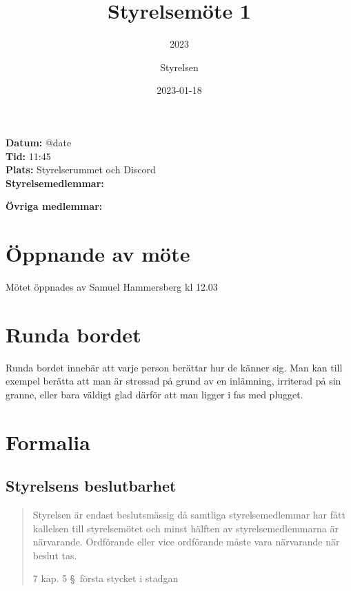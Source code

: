 \documentclass[protokoll]{dvd}
\begin{document}
\title{Styrelsemöte 1}
\subtitle{2023}
\author{Styrelsen}
\date{2023-01-18}

\textbf{Datum:} \csname @date\endcsname\\
\textbf{Tid:} 11:45\\
\textbf{Plats:} Styrelserummet och Discord\\
\textbf{Styrelsemedlemmar:}
\begin{närvarande_förtroendevalda}
\end{närvarande_förtroendevalda}

\textbf{Övriga medlemmar:}
\begin{närvarande_medlemmar}
\end{närvarande_medlemmar}
   

\section{Öppnande av möte}

Mötet öppnades av Samuel Hammersberg kl 12.03

\section{Runda bordet}

Runda bordet innebär att varje person berättar hur de känner sig.
Man kan till exempel berätta att man är stressad på grund av en inlämning, irriterad på sin granne, eller bara väldigt glad därför att man ligger i fas med plugget.

\section{Formalia}

\subsection{Styrelsens beslutbarhet}

\blockquote[7 kap. 5 \S~första stycket i stadgan][]{%
    Styrelsen är endast beslutsmässig då samtliga styrelsemedlemmar har fått kallelsen till styrelsemötet och minst hälften av styrelsemedlemmarna är närvarande.
    Ordförande eller vice ordförande måste vara närvarande när beslut tas.
}
\end{document}
